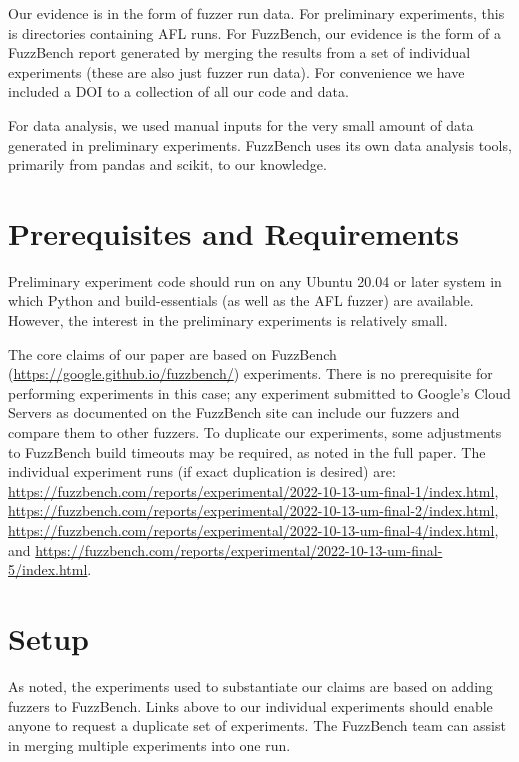 \documentclass[manuscript,screen,review]{acmart}
\begin{document}
Our evidence is in the form of fuzzer run data.  For preliminary
experiments, this is directories containing AFL runs.  For FuzzBench,
our evidence is the form of a FuzzBench report generated by merging
the results from a set of individual experiments (these are also just
fuzzer run data).  For convenience we
have included a DOI to a collection of all our code and data.

For data analysis, we used manual inputs for the very small amount of
data generated in preliminary experiments.  FuzzBench uses its own
data analysis tools, primarily from pandas and scikit, to our knowledge.
  
\section{Prerequisites and Requirements}

Preliminary experiment code should run on any Ubuntu 20.04 or later system in
which Python and build-essentials (as well as the AFL fuzzer) are
available.  However, the interest in the preliminary experiments is
relatively small.

The core claims of our paper are based on FuzzBench
\cite{metzman2021fuzzbench}
(\url{https://google.github.io/fuzzbench/}) experiments.  There is no
prerequisite for performing experiments in this case; any experiment
submitted to Google's Cloud Servers as documented on the FuzzBench site
can include our fuzzers and compare them to other fuzzers.
To duplicate our experiments, some adjustments to FuzzBench build
timeouts may be required, as noted in the full paper.  The individual experiment
runs (if exact duplication is desired) are: \url{https://fuzzbench.com/reports/experimental/2022-10-13-um-final-1/index.html}, \url{https://fuzzbench.com/reports/experimental/2022-10-13-um-final-2/index.html}, \url{https://fuzzbench.com/reports/experimental/2022-10-13-um-final-4/index.html}, and \url{https://fuzzbench.com/reports/experimental/2022-10-13-um-final-5/index.html}.

\section{Setup}

As noted, the experiments used to substantiate our claims are based on
adding fuzzers to FuzzBench.  Links above to our individual
experiments should enable anyone to request a duplicate set of
experiments.  The FuzzBench team can assist in merging multiple
experiments into one run.
\end{document}
